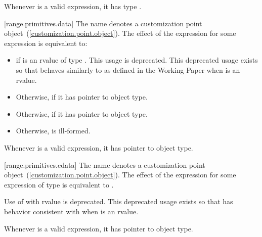\begin{addedblock}
\pnum
\remark Whenever  is a valid expression, it
has type .

[range.primitives.data]{}
\pnum
The name  denotes a customization point
object~(\ref{customization.point.object}). The effect of the expression
 for some expression  is
equivalent to:

\begin{itemize}
\item
   if  is an rvalue of
  type . This usage is deprecated. \enternote
  This deprecated usage exists so that  behaves
  similarly to  as defined in the \Cpp Working
  Paper when  is an rvalue. \exitnote

\item
  Otherwise,  if it has pointer to object type.

\item
  Otherwise,  if it has pointer to object type.

\item
  Otherwise,  is ill-formed.
\end{itemize}

\pnum
\remark Whenever  is a valid expression, it
has pointer to object type.

[range.primitives.cdata]{}
\pnum
The name  denotes a customization point
object~(\ref{customization.point.object}). The effect of the expression
 for some expression  of type 
is equivalent to .

\pnum
Use of  with rvalue  is deprecated.
\enternote This deprecated usage exists so that 
has behavior consistent with  when  is
an rvalue. \exitnote

\pnum
\enternote Whenever  is a valid expression, it
has pointer to object type. \exitnote
\end{addedblock}
